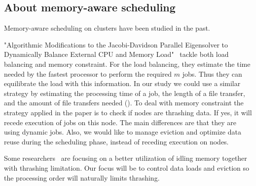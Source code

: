 \documentclass[a4paper]{article}
\begin{document}
\subsection{About memory-aware scheduling}
Memory-aware scheduling on clusters have been studied in the past.
 
"Algorithmic Modifications to the
Jacobi-Davidson Parallel Eigensolver to Dynamically Balance External CPU and Memory Load"~\cite{loadbalance_and_trashing} tackle both load balancing and memory constraint. For the load balancing, they 
estimate the time needed by the fastest processor to perform the required $m$ jobs. Thus they can equilibrate the load
with this information. In our study we could use a similar strategy by estimating the 
processing time of a job, the length of a file transfer, and the amount of file transfers needed
().
To deal with memory constraint the strategy applied in the paper is to check if 
nodes are thrashing data. If yes, it will recede execution of jobs on this node.
The main differences are that they are using dynamic jobs. Also, we would like to 
manage eviction and optimize data reuse during the scheduling phase, instead of
receding execution on nodes.

Some researchers~\cite{Nikolopoulos2003AdaptiveSU}
are focusing on a better utilization of idling memory together with 
thrashing limitation. Our focus will be to control data loads and eviction so the
processing order will naturally limits thrashing.
\end{document}
